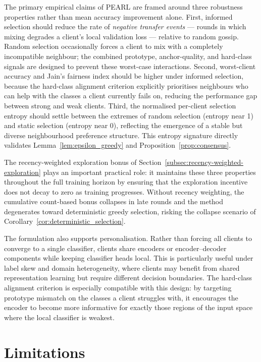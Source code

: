 \documentclass[conference]{IEEEtran}
\begin{document}
The primary empirical claims of PEARL are framed around three robustness properties rather than mean accuracy improvement alone. First, informed selection should reduce the rate of \emph{negative transfer events} — rounds in which mixing degrades a client's local validation loss — relative to random gossip. Random selection occasionally forces a client to mix with a completely incompatible neighbour; the combined prototype, anchor-quality, and hard-class signals are designed to prevent these worst-case interactions. Second, worst-client accuracy and Jain's fairness index should be higher under informed selection, because the hard-class alignment criterion explicitly prioritises neighbours who can help with the classes a client currently fails on, reducing the performance gap between strong and weak clients. Third, the normalised per-client selection entropy should settle between the extremes of random selection (entropy near 1) and static selection (entropy near 0), reflecting the emergence of a stable but diverse neighbourhood preference structure. This entropy signature directly validates Lemma~\ref{lem:epsilon_greedy} and Proposition~\ref{prop:consensus}.

The recency-weighted exploration bonus of Section~\ref{subsec:recency-weighted-exploration} plays an important practical role: it maintains these three properties throughout the full training horizon by ensuring that the exploration incentive does not decay to zero as training progresses. Without recency weighting, the cumulative count-based bonus collapses in late rounds and the method degenerates toward deterministic greedy selection, risking the collapse scenario of Corollary~\ref{cor:deterministic_selection}.

The formulation also supports personalisation. Rather than forcing all clients to converge to a single classifier, clients share encoders or encoder--decoder components while keeping classifier heads local. This is particularly useful under label skew and domain heterogeneity, where clients may benefit from shared representation learning but require different decision boundaries. The hard-class alignment criterion is especially compatible with this design: by targeting prototype mismatch on the classes a client struggles with, it encourages the encoder to become more informative for exactly those regions of the input space where the local classifier is weakest.

\section{Limitations}
\label{sec:limitations}
\end{document}
